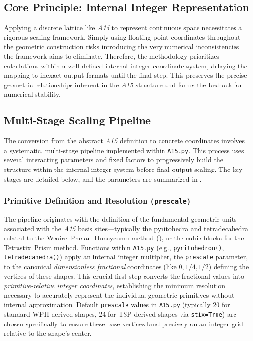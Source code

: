 \documentclass[10pt]{article}
\def\AAAB{\textit{A15}}
\def\WP{Weaire--Phelan}
\def\WPH{\WP{}~Honeycomb}
\def\TSP{Tetrastix~Prism}
\begin{document}
\subsection{Core Principle: Internal Integer Representation}\label{subsec:scaling-framework}

Applying a discrete lattice like \AAAB{} to represent continuous space necessitates a rigorous scaling framework. Simply using floating-point coordinates throughout the geometric construction risks introducing the very numerical inconsistencies the framework aims to eliminate. Therefore, the methodology prioritizes calculations within a well-defined internal integer coordinate system, delaying the mapping to inexact output formats until the final step. This preserves the precise geometric relationships inherent in the \AAAB{} structure and forms the bedrock for numerical stability.

\subsection{Multi-Stage Scaling Pipeline}\label{subsec:scaling-pipeline}

The conversion from the abstract \AAAB{} definition to concrete coordinates involves a systematic, multi-stage pipeline implemented within \texttt{A15.py}. This process uses several interacting parameters and fixed factors to progressively build the structure within the internal integer system before final output scaling. The key stages are detailed below, and the parameters are summarized in .

\subsubsection{Primitive Definition and Resolution (\texttt{prescale})}\label{subsubsec:scaling-prescale}
The pipeline originates with the definition of the fundamental geometric units associated with the \AAAB{} basis sites—typically the pyritohedra and tetradecahedra related to the \WPH{} method (), or the cubic blocks for the \TSP{} method. Functions within \texttt{A15.py} (e.g., \texttt{pyritohedron()}, \texttt{tetradecahedra()}) apply an internal integer multiplier, the \texttt{prescale} parameter, to the canonical \emph{dimensionless fractional} coordinates (like $0, 1/4, 1/2$) defining the vertices of these shapes. This crucial first step converts the fractional values into \emph{primitive-relative integer coordinates}, establishing the minimum resolution necessary to accurately represent the individual geometric primitives without internal approximation. Default \texttt{prescale} values in \texttt{A15.py} (typically \num{20} for standard WPH-derived shapes, \num{24} for TSP-derived shapes via \texttt{stix=True}) are chosen specifically to ensure these base vertices land precisely on an integer grid relative to the shape's center.
\end{document}
